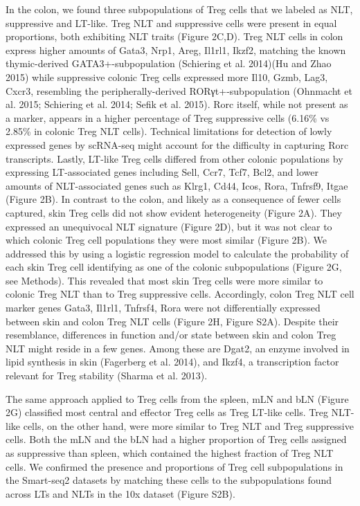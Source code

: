 In the colon, we found three subpopulations of Treg cells that we labeled as NLT, suppressive and LT-like. Treg NLT and suppressive cells were present in equal proportions, both exhibiting NLT traits (Figure 2C,D). Treg NLT cells in colon express higher amounts of Gata3, Nrp1, Areg, Il1rl1, Ikzf2, matching the known thymic-derived GATA3+-subpopulation (Schiering et al. 2014)(Hu and Zhao 2015) while suppressive colonic Treg cells expressed more Il10, Gzmb, Lag3, Cxcr3, resembling the peripherally-derived RORγt+-subpopulation (Ohnmacht et al. 2015; Schiering et al. 2014; Sefik et al. 2015). Rorc itself, while not present as a marker, appears in a higher percentage of Treg suppressive cells (6.16\% vs 2.85\% in colonic Treg NLT cells). Technical limitations for detection of lowly expressed genes by scRNA-seq might account for the difficulty in capturing Rorc transcripts. Lastly, LT-like Treg cells differed from other colonic populations by expressing LT-associated genes including Sell, Ccr7, Tcf7, Bcl2, and lower amounts of NLT-associated genes such as Klrg1, Cd44, Icos, Rora, Tnfrsf9, Itgae (Figure 2B).
In contrast to the colon, and likely as a consequence of fewer cells captured, skin Treg cells did not show evident heterogeneity (Figure 2A). They expressed an unequivocal NLT signature (Figure 2D), but it was not clear to which colonic Treg cell populations they were most similar (Figure 2B). We addressed this by using a logistic regression model to calculate the probability of each skin Treg cell identifying as one of the colonic subpopulations (Figure 2G, see Methods). This revealed that most skin Treg cells were more similar to colonic Treg NLT than to Treg suppressive cells. Accordingly, colon Treg NLT cell marker genes Gata3, Il1rl1, Tnfrsf4, Rora were not differentially expressed between skin and colon Treg NLT cells (Figure 2H, Figure S2A). Despite their resemblance, differences in function and/or state between skin and colon Treg NLT might reside in a few genes. Among these are Dgat2, an enzyme involved in lipid synthesis in skin (Fagerberg et al. 2014), and Ikzf4, a transcription factor relevant for Treg stability (Sharma et al. 2013).

The same approach applied to Treg cells from the spleen, mLN and bLN (Figure 2G) classified most central and effector Treg cells as Treg LT-like cells. Treg NLT-like cells, on the other hand, were more similar to Treg NLT and Treg suppressive cells. Both the mLN and the bLN had a higher proportion of Treg cells assigned as suppressive than spleen, which contained the highest fraction of Treg NLT cells. We confirmed the presence and proportions of Treg cell subpopulations in the Smart-seq2 datasets by matching these cells to the subpopulations found across LTs and NLTs in the 10x dataset (Figure S2B).

